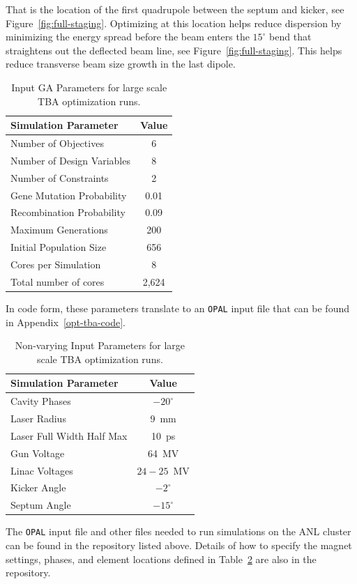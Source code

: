 That is the location of the first quadrupole between the septum and kicker, see Figure~\ref{fig:full-staging}.
Optimizing at this location helps reduce dispersion by minimizing 
the energy spread before the beam enters the $15^\circ$ bend that straightens out 
the deflected beam line, see Figure~\ref{fig:full-staging}.
This helps reduce transverse beam size growth in the last dipole.
\begin{table}%
	\begin{center}
		\caption{Input GA Parameters for large scale TBA optimization runs.}
		\label{tab:opt-tba}
		\begin{tabular}{lc}
			\toprule
			\toprule
			\textbf{Simulation Parameter} 	&  \textbf{Value} \\ 
			\midrule
			{Number of Objectives}			&  6 \\
			Number of Design Variables		&  8 \\
			Number of Constraints			&  2 \\
			{Gene Mutation Probability} 	&  0.01\\ 
			{Recombination Probability} 	&  0.09 \\
			{Maximum  Generations}			&  200 \\
			{Initial  Population Size}		&  656\\ 
			Cores per Simulation 			&  8 \\
			Total number of cores			& 2,624  \\
			\bottomrule
		\end{tabular}
	\end{center}
\end{table}
In code form, these parameters translate to an \verb|OPAL| input file that 
can be found in Appendix~\ref{opt-tba-code}.
\begin{table}%
	\begin{center}
		\caption{Non-varying Input Parameters for large scale TBA optimization runs.}
		\label{tab:variables}
		\begin{tabular}{lc}
			\toprule
			\toprule
			\textbf{Simulation Parameter} 	&  \textbf{Value} \\ 
			\midrule
			Cavity Phases		&  $-20^\circ$ \\
			Laser Radius		& \SI{9}{mm} \\
			Laser Full Width Half Max	& \SI{10}{ps} \\
			Gun Voltage 				& \SI{64}{MV}\\ 
			Linac Voltages 				& $24-25$\SI{}{MV} \\
			Kicker Angle				& $-2^\circ$ \\
			Septum Angle				& $-15^\circ$\\ 
			\bottomrule
		\end{tabular}
	\end{center}
\end{table}
The \verb|OPAL| input file and other files needed to run simulations on the ANL cluster 
can be found in the repository listed above.
Details of how to specify the magnet settings, phases, and element locations defined 
in Table~\ref{tab:variables} are also in the repository.


